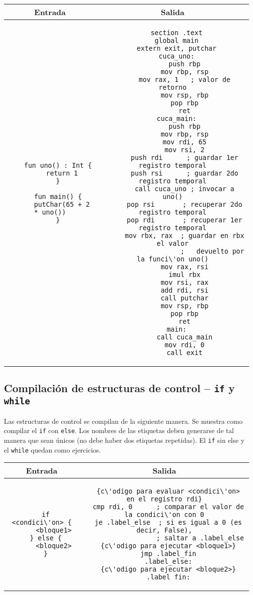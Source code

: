 \documentclass{article}
\newcounter{ejercicio}
\begin{document}
\begin{center}
\begin{tabular}[t]{c@{\hspace{1cm}}|@{\hspace{1cm}}c}
Entrada & Salida
\\
\hline
  \begin{lstlisting}
    fun uno() : Int {
      return 1
    }

    fun main() {
      putChar(65 + 2 * uno())
    }
  \end{lstlisting}
&
  \begin{lstlisting}
  section .text
  global main
  extern exit, putchar
  cuca_uno:
      push rbp
      mov rbp, rsp
      mov rax, 1   ; valor de retorno
      mov rsp, rbp
      pop rbp
      ret
  cuca_main:
      push rbp
      mov rbp, rsp
      mov rdi, 65
      mov rsi, 2
      push rdi      ; guardar 1er registro temporal
      push rsi      ; guardar 2do registro temporal
      call cuca_uno ; invocar a uno()
      pop rsi       ; recuperar 2do registro temporal
      pop rdi       ; recuperar 1er registro temporal
      mov rbx, rax  ; guardar en rbx el valor
                    ;   devuelto por la funci\'on uno()
      mov rax, rsi
      imul rbx
      mov rsi, rax
      add rdi, rsi
      call putchar
      mov rsp, rbp
      pop rbp
      ret
  main:
      call cuca_main
      mov rdi, 0
      call exit
  \end{lstlisting}
\end{tabular}
\end{center}

\subsection{Compilaci\'on de estructuras de control -- \texttt{if} y \texttt{while}}

Las estructuras de control se compilan de la siguiente manera.
Se muestra como compilar el \texttt{if} con \texttt{else}.
Los nombres de las etiquetas deben generarse de tal manera que sean
\'unicos (no debe haber dos etiquetas repetidas).
El \texttt{if} sin else y el \texttt{while} quedan como ejercicios.

\begin{center}
\begin{tabular}[t]{c@{\hspace{1cm}}|@{\hspace{1cm}}c}
Entrada & Salida
\\
\hline
  \begin{lstlisting}
  if <condici\'on> {
      <bloque1>
  } else {
      <bloque2>
  }
  \end{lstlisting}
&
  \begin{lstlisting}
  {c\'odigo para evaluar <condici\'on> en el registro rdi}
  cmp rdi, 0      ; comparar el valor de la condici\'on con 0
  je .label_else  ; si es igual a 0 (es decir, False),
                  ; saltar a .label_else
  {c\'odigo para ejecutar <bloque1>}
  jmp .label_fin
  .label_else:
  {c\'odigo para ejecutar <bloque2>}
  .label_fin:
  \end{lstlisting}
\end{tabular}
\end{center}
\end{document}
